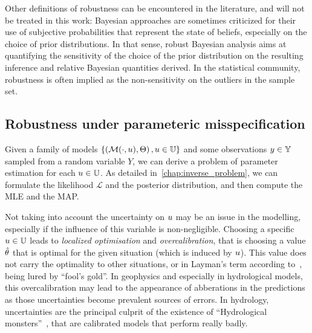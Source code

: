 \documentclass[../../Main_ManuscritThese.tex]{subfiles}
\begin{document}
Other definitions of robustness can be encountered in the literature, and will not be treated in this work: Bayesian approaches are sometimes criticized for their use of subjective probabilities that represent the state of beliefs, especially on the choice of prior distributions. In that sense, robust Bayesian analysis aims at quantifying the sensitivity of the choice of the prior distribution on the resulting inference and relative Bayesian quantities derived. In the statistical community, robustness is often implied as the non-sensitivity on the outliers in the sample set.



\subsection{Robustness under parameteric misspecification}

Given a family of models $\left\{\left(\mathcal{M}(\cdot, u), \Theta\right), u\in\mathbb{U}\right\}$ and some observations $y\in \mathbb{Y}$ sampled from a random variable $Y$, we can derive a problem of parameter estimation for each $u \in \mathbb{U}$. As detailed in~\cref{chap:inverse_problem}, we can formulate the likelihood $\mathcal{L}$ and the posterior distribution, and then compute the MLE and the MAP.\@



Not taking into account the uncertainty on $u$ may be an issue in the modelling, especially if the influence of this variable is non-negligible.
Choosing a specific $u \in \mathbb{U}$ leads to \emph{localized optimisation} \citep{huyse_free-form_2001} and \emph{overcalibration}, that is choosing a value $\hat{\theta}$ that is optimal for the given situation (which is induced by $u$). This value does not carry the optimality to other situations, or in Layman's term according to~\cite{andreassian_all_2012}, being lured by ``fool's gold''.
In geophysics and especially in hydrological models, this overcalibration may lead to the appearance of abberations in the predictions as those uncertainties become prevalent sources of errors. In hydrology, uncertainties are the principal culprit of the existence of  ``Hydrological monsters''~\citep{kuczera_there_2010}, that are calibrated models that perform really badly.
\end{document}
